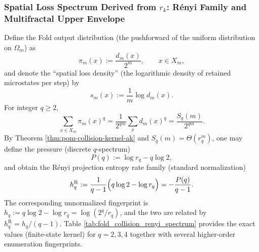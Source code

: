 \subsubsection{Spatial Loss Spectrum Derived from \texorpdfstring{$r_k$}{rk}: R\'enyi Family and Multifractal Upper Envelope}\label{subsec:pom-multifractal-from-rk}
Define the Fold output distribution (the pushforward of the uniform distribution on $\Omega_m$) as
\[
\pi_m(x):=\frac{d_m(x)}{2^m},\qquad x\in X_m,
\]
and denote the ``spatial loss density'' (the logarithmic density of retained microstates per step) by
\[
s_m(x):=\frac{1}{m}\log d_m(x).
\]
For integer $q\ge 2$,
\[
\sum_{x\in X_m}\pi_m(x)^q
=\frac{1}{2^{qm}}\sum_x d_m(x)^q
=\frac{S_q(m)}{2^{qm}}.
\]
By Theorem \ref{thm:pom-collision-kernel-ak} and $S_q(m)=\Theta(r_q^m)$, one may define the pressure (discrete $q$-spectrum)
\[
P(q):=\log r_q-q\log 2,
\]
and obtain the R\'enyi projection entropy rate family (standard normalization)
\[
h_q^{\mathrm{R}}:=\frac{1}{q-1}\Bigl(q\log 2-\log r_q\Bigr)= -\frac{P(q)}{q-1}.
\]
The corresponding unnormalized fingerprint is \(h_q:=q\log 2-\log r_q=\log(2^q/r_q)\), and the two are related by \(h_q^{\mathrm{R}}=h_q/(q-1)\).
Table \ref{tab:fold_collision_renyi_spectrum} provides the exact values (finite-state kernel) for $q=2,3,4$ together with several higher-order enumeration fingerprints.

